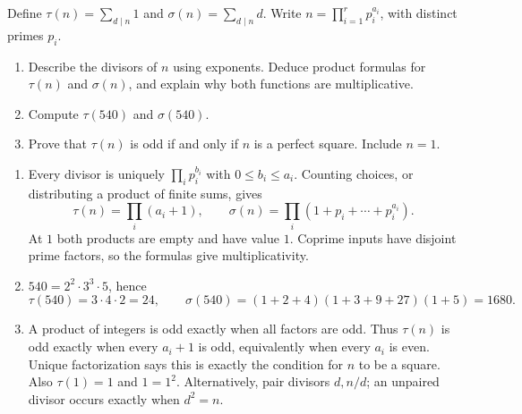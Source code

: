 Define $\tau(n)=\sum_{d\mid n}1$ and $\sigma(n)=\sum_{d\mid n}d$.
Write $n=\prod_{i=1}^r p_i^{a_i}$, with distinct primes $p_i$.
\begin{enumerate}
  \item Describe the divisors of $n$ using exponents. Deduce product
  formulas for $\tau(n)$ and $\sigma(n)$, and explain why both
  functions are multiplicative. 
  \item Compute $\tau(540)$ and $\sigma(540)$. 
  \item Prove that $\tau(n)$ is odd if and only if $n$ is a perfect
  square. Include $n=1$. 
\end{enumerate}
\begin{solution}
\begin{enumerate}
  \item Every divisor is uniquely $\prod_i p_i^{b_i}$ with
  $0\le b_i\le a_i$. Counting choices, or distributing a product of
  finite sums, gives
  \[
    \tau(n)=\prod_i(a_i+1),\qquad
    \sigma(n)=\prod_i(1+p_i+\cdots+p_i^{a_i}).
  \]
  At $1$ both products are empty and have value $1$. Coprime inputs
  have disjoint prime factors, so the formulas give multiplicativity.
  \item $540=2^2\cdot3^3\cdot5$, hence
  \[
    \tau(540)=3\cdot4\cdot2=24,\qquad
    \sigma(540)=(1+2+4)(1+3+9+27)(1+5)=1680.
  \]
  \item A product of integers is odd exactly when all factors are odd.
  Thus $\tau(n)$ is odd exactly when every $a_i+1$ is odd, equivalently
  when every $a_i$ is even. Unique factorization says this is exactly
  the condition for $n$ to be a square. Also $\tau(1)=1$ and $1=1^2$.
  Alternatively, pair divisors $d,n/d$; an unpaired divisor occurs
  exactly when $d^2=n$.
\end{enumerate}
\end{solution}

\studentbreak
\instructorbreak
{}

